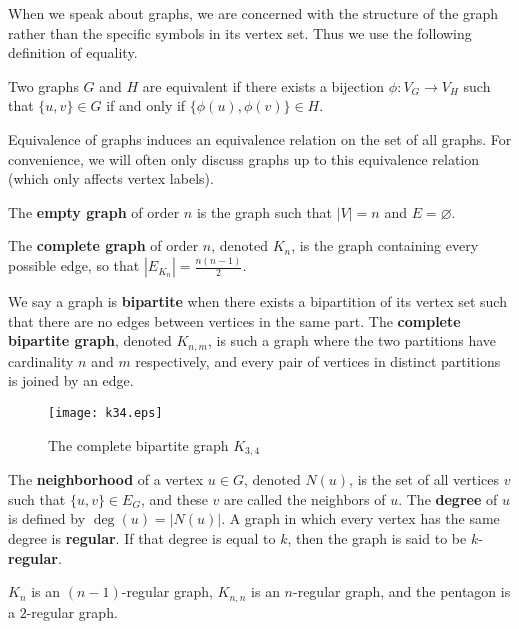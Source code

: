 When we speak about graphs, we are concerned with the structure of the graph
rather than the specific symbols in its vertex set. Thus we use the following
definition of equality.

\begin{definition}
  Two graphs $G$ and $H$ are equivalent if there exists a bijection $\phi : V_G \to V_H$
  such that $\{u,v\} \in G$ if and only if $\{\phi(u),\phi(v)\} \in H$.
\end{definition}

Equivalence of graphs induces an equivalence relation on the set of all graphs. For convenience, we
will often only discuss graphs up to this equivalence relation (which only affects vertex labels).

\begin{example}
  The \textbf{empty graph} of order $n$ is the graph such that $|V| = n$ and $E
  = \varnothing$.

  The \textbf{complete graph} of order $n$, denoted $K_n$, is the graph containing every possible
  edge, so that $|E_{K_n}| = \frac{n(n-1)}{2}$.

  We say a graph is \textbf{bipartite} when there exists a bipartition of its vertex set such that
  there are no edges between vertices in the same part. The \textbf{complete bipartite graph},
  denoted $K_{n,m}$, is such a graph where the two partitions have cardinality $n$ and $m$
  respectively, and every pair of vertices in distinct partitions is joined by an edge.
\end{example}

\begin{figure}[H]
  \centering
  \texttt{[image: k34.eps]}
  \caption{The complete bipartite graph $K_{3,4}$}
  \label{fig:k34}
\end{figure}

\begin{definition}
  The \textbf{neighborhood} of a vertex $u \in G$, denoted $N(u)$, is the set of all vertices $v$
  such that $\{u,v\} \in E_G$, and these $v$ are called the neighbors of $u$. The \textbf{degree} of
  $u$ is defined by $\deg(u) = |N(u)|$. A graph in which every vertex has the same degree is
  \textbf{regular}. If that degree is equal to $k$, then the graph is said to be $k$-\textbf{regular}.
\end{definition}

\begin{example}
  $K_n$ is an $(n-1)$-regular graph, $K_{n,n}$ is an $n$-regular graph, and the pentagon is a
  $2$-regular graph.
\end{example}

